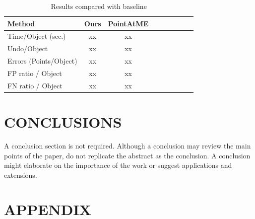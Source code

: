 \documentclass[letterpaper, 10 pt, conference]{ieeeconf}  %
\begin{document}
\begin{table}[h]
	\centering
	\caption{Results compared with baseline}
	\label{tab:metrics}
	\begin{tabular}{|l|c|c|c|c||c|c|c|c|}
		\hline
		\textbf{Method} & \textbf{Ours} & \textbf{PointAtME\cite{pointatme}} \\
		\hline
		\hline
		Time/Object (sec.) & xx & xx\\
		\hline
		Undo/Object & xx & xx\\
		\hline
		Errors (Points/Object) & xx & xx\\
		\hline
		FP ratio / Object & xx & xx\\
		\hline
		FN ratio / Object & xx & xx\\
		\hline
	\end{tabular}
\end{table}


\section{CONCLUSIONS}
\label{conclusions}
A conclusion section is not required. Although a conclusion may review the main points of the paper, do not replicate the abstract as the conclusion. A conclusion might elaborate on the importance of the work or suggest applications and extensions.

\addtolength{\textheight}{-12cm}   %









\section*{APPENDIX}
\end{document}
